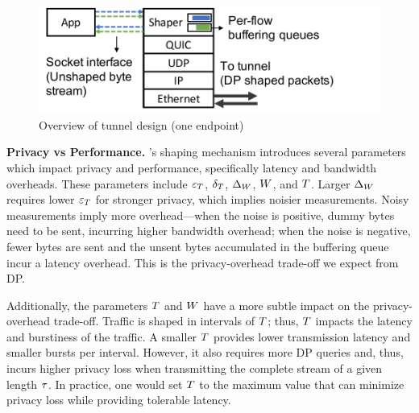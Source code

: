 \begin{figure}[t]
    \centering
    \includegraphics[width=\columnwidth]{design2-figure.pdf}
    \caption{Overview of tunnel design (one endpoint)
    }
    \vspace{-0.4cm}
    \label{fig:minesvpn-overview}
\end{figure}




\textbf{Privacy vs Performance.}
\sys's shaping mechanism introduces several parameters which impact privacy and
performance, specifically latency and bandwidth overheads. These parameters
include $\varepsilon_T$, $\delta_T$, $\Delta_{W}$, $W$, and
$T$.
%
Larger $\Delta_{W}$ requires lower $\varepsilon_{T}$ for stronger privacy,
which implies noisier measurements.
Noisy measurements imply more overhead---when the noise is positive, dummy bytes
need to be sent, incurring higher bandwidth overhead; when the noise is
negative, fewer bytes are sent and the unsent bytes accumulated in the buffering
queue incur a latency overhead.
This is the privacy-overhead trade-off we expect from DP.

Additionally, the parameters $T$ and $W$ have a more subtle impact
on the privacy-overhead trade-off.
Traffic is shaped in intervals of $T$; thus, $T$ impacts the
latency and burstiness of the traffic.
A smaller $T$ provides lower transmission latency and smaller bursts per
interval. However, it also requires more DP queries and, thus, incurs higher
privacy loss when transmitting the complete stream of a given length
$\tau$.
In practice, one would set $T$ to the maximum value that can minimize
privacy loss while providing tolerable latency.

